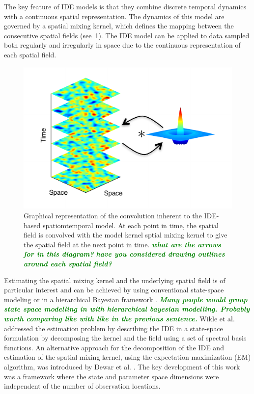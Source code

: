 \documentclass[10pt,twocolumn,twoside]{IEEEtran}
\newcommand{\mike}[1]{\textsf{\emph{\textbf{\textcolor{green}{#1}}}}}
\begin{document}
The key feature of IDE models is that they combine discrete temporal dynamics with a continuous spatial representation.
The dynamics of this model are governed by a spatial mixing kernel, which defines the mapping between the consecutive spatial fields (see~\figurename{\ref{fig:IDEConcept}}).
The IDE model can be applied to data sampled both regularly and irregularly in space due to the continuous representation of each spatial field.

\begin{figure}[ht]
	\centering
		\includegraphics[scale=1]{./Graph/FieldsAndKernel_Arrows.pdf}
	\caption{
        Graphical representation of the convolution inherent to the IDE-based spatiomtemporal model.
        At each point in time, the spatial field is convolved with the model kernel sptial mixing kernel to give the spatial field at the next point in time.
        \mike{what are the arrows for in this diagram?}
        \mike{have you considered drawing outlines around each spatial field?}
}
	\label{fig:IDEConcept}
\end{figure}

Estimating the spatial mixing kernel and the underlying spatial field is of particular interest and can be achieved by using conventional state-space modeling \cite{Dewar2009,Scerri2009} or in a hierarchical Bayesian framework \cite{Wikle1999,Xu2005,Wikle2011}.
\mike{Many people would group state space modelling in with hierarchical bayesian modelling. Probably worth comparing like with like in the previous sentence.}
Wikle et al.  \cite{Wikle2004} addressed the estimation problem by describing the IDE in a state-space formulation by decomposing the kernel and the field using a set of spectral basis functions.
An alternative approach for the decomposition of the IDE and estimation of the spatial mixing kernel, using the expectation maximization (EM) algorithm, was introduced by Dewar et al.  \cite{Dewar2009}.
The key development of this work was a framework where the state and parameter space dimensions were independent of the number of observation locations.
\end{document}
